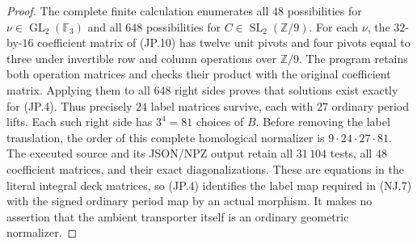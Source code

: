 \begin{proof}
The complete finite calculation enumerates all $48$ possibilities
for $\nu\in\operatorname{GL}_2(\mathbb F_3)$ and all $648$
possibilities for $C\in\operatorname{SL}_2(\mathbb Z/9)$.
For each $\nu$, the $32$-by-$16$ coefficient matrix of (JP.10)
has twelve unit pivots and four pivots equal to three under
invertible row and column operations over $\mathbb Z/9$.
The program retains both operation matrices and checks their
product with the original coefficient matrix.  Applying them
to all $648$ right sides proves that solutions exist exactly
for (JP.4).  Thus precisely $24$ label matrices survive, each
with $27$ ordinary period lifts.  Each such right side has
$3^4=81$ choices of $B$.  Before removing the label translation,
the order of this complete homological normalizer is
$9\cdot24\cdot27\cdot81$.
The executed source
 and its JSON/NPZ output
retain all $31\,104$ tests, all $48$ coefficient matrices,
and their exact diagonalizations.  These are equations in the
literal integral deck matrices, so (JP.4) identifies the label
map required in (NJ.7) with the signed ordinary period map by
an actual morphism.  It makes no assertion that the ambient
transporter itself is an ordinary geometric normalizer.
\end{proof}
